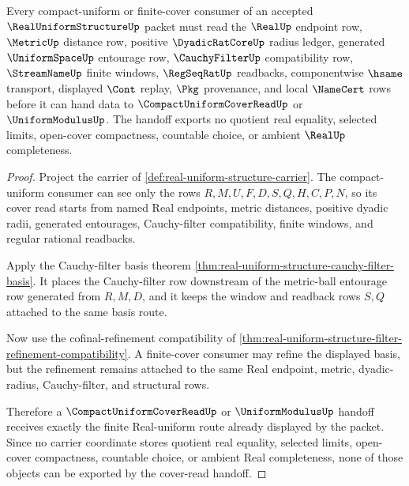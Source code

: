 \begin{theorem}
\label{thm:real-uniform-structure-cover-read-handoff}
Every compact-uniform or finite-cover consumer of an accepted $\RealUniformStructureUp$ packet must read the $\RealUp$ endpoint row, $\MetricUp$ distance row, positive $\DyadicRatCoreUp$ radius ledger, generated $\UniformSpaceUp$ entourage row, $\CauchyFilterUp$ compatibility row, $\StreamNameUp$ finite windows, $\RegSeqRatUp$ readbacks, componentwise $\hsame$ transport, displayed $\Cont$ replay, $\Pkg$ provenance, and local $\NameCert$ rows before it can hand data to $\CompactUniformCoverReadUp$ or $\UniformModulusUp$. The handoff exports no quotient real equality, selected limits, open-cover compactness, countable choice, or ambient $\RealUp$ completeness.
\end{theorem}
\begin{proof}
Project the carrier of \autoref{def:real-uniform-structure-carrier}. The compact-uniform consumer can see only the rows $R,M,U,F,D,S,Q,H,C,P,N$, so its cover read starts from named Real endpoints, metric distances, positive dyadic radii, generated entourages, Cauchy-filter compatibility, finite windows, and regular rational readbacks.

Apply the Cauchy-filter basis theorem \autoref{thm:real-uniform-structure-cauchy-filter-basis}. It places the Cauchy-filter row downstream of the metric-ball entourage row generated from $R,M,D$, and it keeps the window and readback rows $S,Q$ attached to the same basis route.

Now use the cofinal-refinement compatibility of \autoref{thm:real-uniform-structure-filter-refinement-compatibility}. A finite-cover consumer may refine the displayed basis, but the refinement remains attached to the same Real endpoint, metric, dyadic-radius, Cauchy-filter, and structural rows.

Therefore a $\CompactUniformCoverReadUp$ or $\UniformModulusUp$ handoff receives exactly the finite Real-uniform route already displayed by the packet. Since no carrier coordinate stores quotient real equality, selected limits, open-cover compactness, countable choice, or ambient Real completeness, none of those objects can be exported by the cover-read handoff.
\end{proof}

